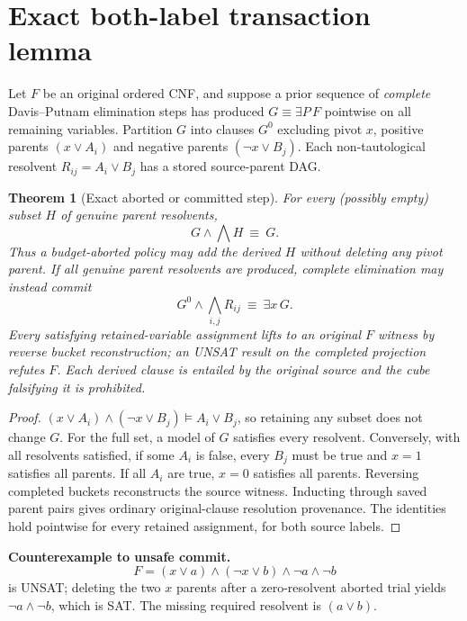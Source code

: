 \documentclass[11pt]{article}
\newtheorem{theorem}{Theorem}
\begin{document}
\section{Exact both-label transaction lemma}
Let $F$ be an original ordered CNF, and suppose a prior sequence of \emph{complete} Davis--Putnam elimination steps has produced $G\equiv\exists P\,F$ pointwise on all remaining variables. Partition $G$ into clauses $G^0$ excluding pivot $x$, positive parents $(x\vee A_i)$ and negative parents $(\neg x\vee B_j)$. Each non-tautological resolvent $R_{ij}=A_i\vee B_j$ has a stored source-parent DAG.

\begin{theorem}[Exact aborted or committed step]
For every (possibly empty) subset $H$ of genuine parent resolvents,
\[
 G\wedge\bigwedge H\ \equiv\ G.
\]
Thus a budget-aborted policy may add the derived $H$ \emph{without deleting any pivot parent}. If all genuine parent resolvents are produced, complete elimination may instead commit
\[
 G^0\wedge\bigwedge_{i,j}R_{ij}\ \equiv\ \exists x\,G.
\]
Every satisfying retained-variable assignment lifts to an original $F$ witness by reverse bucket reconstruction; an UNSAT result on the completed projection refutes $F$. Each derived clause is entailed by the original source and the cube falsifying it is prohibited.
\end{theorem}
\begin{proof}
$(x\vee A_i)\wedge(\neg x\vee B_j)\models A_i\vee B_j$, so retaining any subset does not change $G$. For the full set, a model of $G$ satisfies every resolvent. Conversely, with all resolvents satisfied, if some $A_i$ is false, every $B_j$ must be true and $x=1$ satisfies all parents. If all $A_i$ are true, $x=0$ satisfies all parents. Reversing completed buckets reconstructs the source witness. Inducting through saved parent pairs gives ordinary original-clause resolution provenance. The identities hold pointwise for every retained assignment, for both source labels.
\end{proof}

\noindent\textbf{Counterexample to unsafe commit.}
\[
F=(x\vee a)\wedge(\neg x\vee b)\wedge\neg a\wedge\neg b
\]
is UNSAT; deleting the two $x$ parents after a zero-resolvent aborted trial yields $\neg a\wedge\neg b$, which is SAT. The missing required resolvent is $(a\vee b)$.
\end{document}
